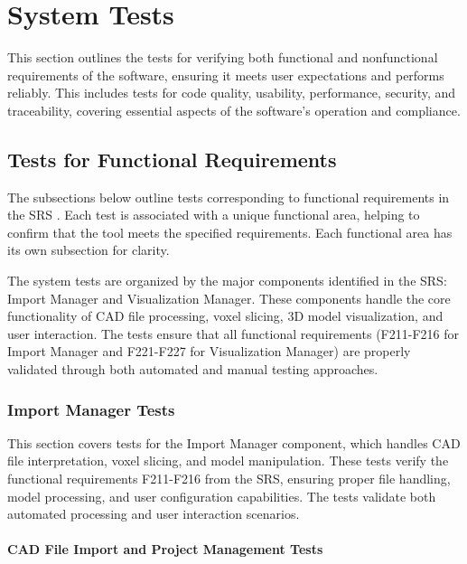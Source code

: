 \documentclass[12pt, titlepage]{article}
\begin{document}


\section{System Tests}

This section outlines the tests for verifying both functional and nonfunctional requirements
of the software, ensuring it meets user expectations and performs reliably. This includes
tests for code quality, usability, performance, security, and traceability, covering essential
aspects of the software's operation and compliance.

\subsection{Tests for Functional Requirements}

The subsections below outline tests corresponding to functional requirements in the SRS \citep{SRS}.
Each test is associated with a unique functional area, helping to confirm that the tool meets
the specified requirements. Each functional area has its own subsection for clarity.

The system tests are organized by the major components identified in the SRS: Import Manager
and Visualization Manager. These components handle the core functionality of CAD file processing,
voxel slicing, 3D model visualization, and user interaction. The tests ensure that all functional
requirements (F211-F216 for Import Manager and F221-F227 for Visualization Manager) are properly
validated through both automated and manual testing approaches.

\subsubsection{Import Manager Tests}

This section covers tests for the Import Manager component, which handles CAD file interpretation,
voxel slicing, and model manipulation. These tests verify the functional requirements F211-F216
from the SRS, ensuring proper file handling, model processing, and user configuration capabilities.
The tests validate both automated processing and user interaction scenarios.

\paragraph{CAD File Import and Project Management Tests}
\end{document}

